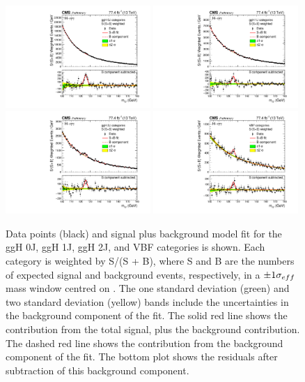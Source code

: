 \begin{figure}[hptb]
  \centering
  \includegraphics[width=0.49\textwidth]{Figures/Results/MassPlot_0J.pdf}
  \includegraphics[width=0.49\textwidth]{Figures/Results/MassPlot_1J.pdf} \\
  \includegraphics[width=0.49\textwidth]{Figures/Results/MassPlot_2J.pdf}
  \includegraphics[width=0.49\textwidth]{Figures/Results/MassPlot_VBF.pdf}
  \caption[Signal plus background fits to data, 
           summed over analysis categories targeting different bins.]
  {
    Data points (black) and signal plus background model fit 
    for the ggH 0J, ggH 1J, ggH 2J, and VBF categories is shown. 
    Each category is weighted by S/(S + B), 
    where S and B are the numbers of expected signal and background events, respectively, 
    in a $\pm 1 \sigma_{eff}$ mass window centred on \mH. 
    The one standard deviation (green) and two standard deviation (yellow) bands 
    include the uncertainties in the background component of the fit. 
    The solid red line shows the contribution from the total signal, plus the background contribution. 
    The dashed red line shows the contribution from the background component of the fit. 
    The bottom plot shows the residuals after subtraction of this background component.
  }
  \label{fig:results_MassPlots}
\end{figure}

